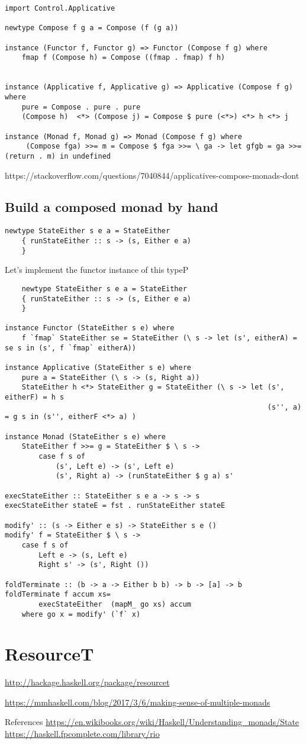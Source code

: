 \begin{verbatim}
import Control.Applicative

newtype Compose f g a = Compose (f (g a))

instance (Functor f, Functor g) => Functor (Compose f g) where
    fmap f (Compose h) = Compose ((fmap . fmap) f h)


instance (Applicative f, Applicative g) => Applicative (Compose f g) where
    pure = Compose . pure . pure
    (Compose h)  <*> (Compose j) = Compose $ pure (<*>) <*> h <*> j

instance (Monad f, Monad g) => Monad (Compose f g) where
     (Compose fga) >>= m = Compose $ fga >>= \ ga -> let gfgb = ga >>= (return . m) in undefined
\end{verbatim}

https://stackoverflow.com/questions/7040844/applicatives-compose-monads-dont


\subsection{Build a composed monad by hand}


\begin{verbatim}
newtype StateEither s e a = StateEither
    { runStateEither :: s -> (s, Either e a)
    }
\end{verbatim}

Let's implement the functor instance of this typeP

\begin{verbatim}
    newtype StateEither s e a = StateEither
    { runStateEither :: s -> (s, Either e a)
    }

instance Functor (StateEither s e) where
    f `fmap` StateEither se = StateEither (\ s -> let (s', eitherA) = se s in (s', f `fmap` eitherA))

instance Applicative (StateEither s e) where
    pure a = StateEither (\ s -> (s, Right a))
    StateEither h <*> StateEither g = StateEither (\ s -> let (s', eitherF) = h s
                                                              (s'', a)      = g s in (s'', eitherF <*> a) )

instance Monad (StateEither s e) where
    StateEither f >>= g = StateEither $ \ s ->
        case f s of
            (s', Left e) -> (s', Left e)
            (s', Right a) -> (runStateEither $ g a) s'

execStateEither :: StateEither s e a -> s -> s
execStateEither stateE = fst . runStateEither stateE

modify' :: (s -> Either e s) -> StateEither s e ()
modify' f = StateEither $ \ s ->
    case f s of
        Left e -> (s, Left e)
        Right s' -> (s', Right ())

foldTerminate :: (b -> a -> Either b b) -> b -> [a] -> b
foldTerminate f accum xs=
        execStateEither  (mapM_ go xs) accum
    where go x = modify' (`f` x)
\end{verbatim}

\section{ResourceT}
\url{http://hackage.haskell.org/package/resourcet}


\url{https://mmhaskell.com/blog/2017/3/6/making-sense-of-multiple-monads}

 References
 \url{https://en.wikibooks.org/wiki/Haskell/Understanding_monads/State}
 \url{https://haskell.fpcomplete.com/library/rio}
